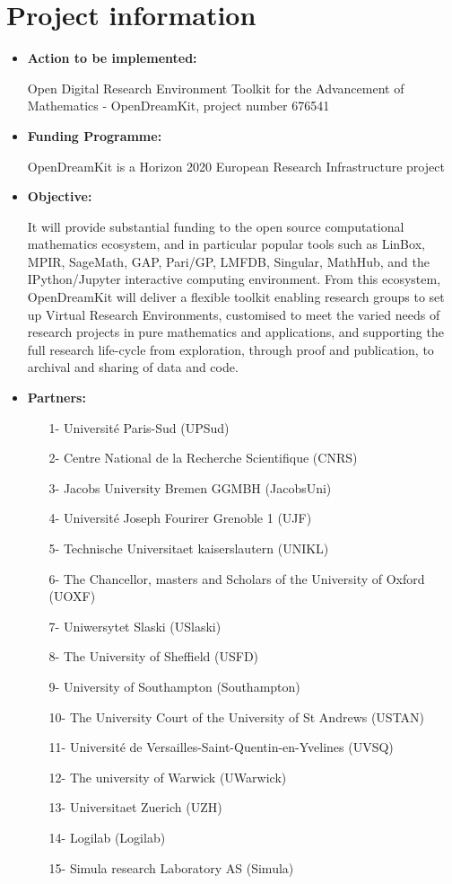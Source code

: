 \documentclass[12pt]{article}
\begin{document}
\section{Project information}
\begin{itemize}
\item\textbf{Action to be implemented:}

Open Digital Research Environment Toolkit for the Advancement of Mathematics - OpenDreamKit, project number 676541
\item\textbf{Funding Programme:}

OpenDreamKit is a Horizon 2020 European Research Infrastructure project 
\item\textbf{Objective:}

It will provide substantial funding to the open source computational mathematics ecosystem, and in particular popular tools such as LinBox, MPIR, SageMath, GAP, Pari/GP, LMFDB, Singular, MathHub, and the IPython/Jupyter interactive computing environment.
From this ecosystem, OpenDreamKit will deliver a flexible toolkit enabling research groups to set up Virtual Research Environments, customised to meet the varied needs of research projects in pure mathematics and applications, and supporting the full research life-cycle from exploration, through proof and publication, to archival and sharing of data and code.
\item\textbf{Partners:}
\begin{enumerate}
\item[1-] Université Paris-Sud (UPSud)
\item[2-] Centre National de la Recherche Scientifique (CNRS)
\item[3-] Jacobs University Bremen GGMBH (JacobsUni)
\item[4-] Université Joseph Fourirer Grenoble 1 (UJF)
\item[5-] Technische Universitaet kaiserslautern (UNIKL)
\item[6-] The Chancellor, masters and Scholars of the University of Oxford (UOXF)
\item[7-] Uniwersytet Slaski (USlaski)
\item[8-] The University of Sheffield (USFD)
\item[9-] University of Southampton (Southampton)
\item[10-] The University Court of the University of St Andrews (USTAN)
\item[11-] Université de Versailles-Saint-Quentin-en-Yvelines (UVSQ)
\item[12-] The university of Warwick (UWarwick)
\item[13-] Universitaet Zuerich (UZH)
\item[14-] Logilab (Logilab)
\item[15-] Simula research Laboratory AS (Simula)
\end{enumerate}
\end{itemize}
\end{document}
